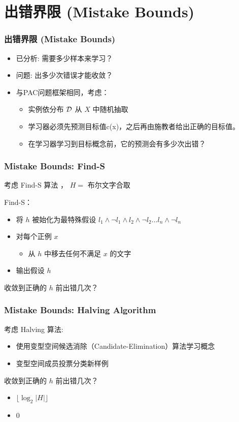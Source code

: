 \documentclass{beamer}
\begin{document}
\section{出错界限 (Mistake Bounds)}
\label{sec-5}
\begin{frame}
\frametitle{出错界限 (Mistake Bounds)}
\label{sec-5-1}

\begin{itemize}
\item 已分析: 需要多少样本来学习？
\item 问题: 出多少次错误才能收敛？
\item 与PAC问题框架相同，考虑：
\begin{itemize}
\item 实例依分布 ${\cal D}$ 从 $X$ 中随机抽取
\item 学习器必须先预测目标值c(x)，之后再由施教者给出正确的目标值。
\item 在学习器学习到目标概念前，它的预测会有多少次出错？
\end{itemize}
\end{itemize}
\end{frame}
\begin{frame}
\frametitle{Mistake Bounds: Find-S}
\label{sec-5-2}


考虑 Find-S 算法 ， $H=$ 布尔文字合取

Find-S：
\begin{itemize}
\item 将 $h$ 被始化为最特殊假设 $l_{1} \land \neg l_{1} \land l_{2} \land \neg l_{2} \ldots l_{n} \land \neg l_{n}$
\item 对每个正例 $x$
\begin{itemize}
\item 从 $h$ 中移去任何不满足 $x$ 的文字
\end{itemize}
\item 输出假设 $h$
\end{itemize}

收敛到正确的 $h$ 前出错几次？
\end{frame}
\begin{frame}
\frametitle{Mistake Bounds: Halving Algorithm}
\label{sec-5-3}


考虑 Halving 算法:
\begin{itemize}
\item 使用变型空间候选消除（Candidate-Elimination）算法学习概念
\item 变型空间成员投票分类新样例
\end{itemize}

收敛到正确的 $h$ 前出错几次？
\begin{itemize}
\item $\lfloor \log_2 |H| \rfloor$
\item 0
\end{itemize}
\end{frame}
\end{document}
